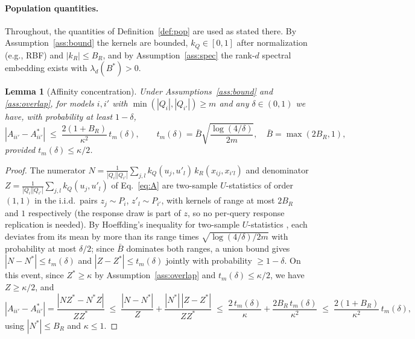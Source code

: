 \documentclass{article}
\newtheorem{lemma}{Lemma}
\theoremstyle{definition}
\theoremstyle{remark}
\theoremstyle{plain}
\begin{document}
\paragraph{Population quantities.} Throughout, the quantities of
Definition~\ref{def:pop} are used as stated there. By Assumption~\ref{ass:bound} the
kernels are bounded, $k_Q\in[0,1]$ after normalization (e.g., RBF) and $|k_R|\le B_R$,
and by Assumption~\ref{ass:spec} the rank-$d$ spectral embedding exists with
$\lambda_d(B^*)>0$.

\begin{lemma}[Affinity concentration]
\label{lem:conc}
Under Assumptions~\ref{ass:bound} and \ref{ass:overlap}, for models $i,i'$ with
$\min(|Q_i|,|Q_{i'}|)\ge m$ and any $\delta\in(0,1)$ we have, with probability at
least $1-\delta$,
\[
|A_{ii'}-A^*_{ii'}|\;\le\;\frac{2(1+B_R)}{\kappa^2}\,t_m(\delta),
\qquad t_m(\delta)=\bar B\sqrt{\frac{\log(4/\delta)}{2m}},\quad \bar B=\max(2B_R,1),
\]
provided $t_m(\delta)\le\kappa/2$.
\end{lemma}
\begin{proof}
\begin{sloppypar}
The numerator $N=\frac{1}{|Q_i||Q_{i'}|}\sum_{j,l}k_Q(u_j,u'_l)\,k_R(x_{ij},x_{i'l})$ and
denominator $Z=\frac{1}{|Q_i||Q_{i'}|}\sum_{j,l}k_Q(u_j,u'_l)$ of Eq.~\eqref{eq:A} are
two-sample $U$-statistics of order $(1,1)$ in the i.i.d.\ pairs $z_j\sim P_i$,
$z'_l\sim P_{i'}$, with kernels of range at most $2B_R$ and $1$ respectively (the
response draw is part of $z$, so no per-query response replication is needed). By
Hoeffding's inequality for two-sample $U$-statistics
\citep[Section~5]{hoeffding1963}, each deviates from its mean by more than its range times
$\sqrt{\log(4/\delta)/2m}$ with probability at most $\delta/2$; since $\bar B$ dominates
both ranges, a union bound gives $|N-N^*|\le t_m(\delta)$ and $|Z-Z^*|\le t_m(\delta)$
jointly with probability $\ge1-\delta$. On this event, since $Z^*\ge\kappa$ by Assumption~\ref{ass:overlap} and $t_m(\delta)\le\kappa/2$,
we have $Z\ge\kappa/2$, and
\[
|A_{ii'}-A^*_{ii'}|=\frac{|NZ^*-N^*Z|}{ZZ^*}
\;\le\;\frac{|N-N^*|}{Z}+\frac{|N^*|\,|Z-Z^*|}{ZZ^*}
\;\le\;\frac{2\,t_m(\delta)}{\kappa}+\frac{2B_R\,t_m(\delta)}{\kappa^2}
\;\le\;\frac{2(1+B_R)}{\kappa^2}\,t_m(\delta),
\]
using $|N^*|\le B_R$ and $\kappa\le1$.
\end{sloppypar}
\end{proof}
\end{document}
